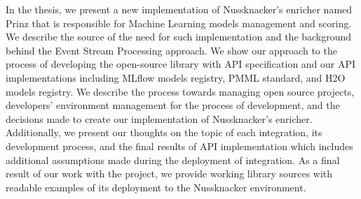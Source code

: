 In the thesis, we present a new implementation of Nussknacker's enricher named Prinz that is responsible for
Machine Learning models management and scoring. We describe the source of the need for such implementation and
the background behind the Event Stream Processing approach. We show our approach to the process of developing
the open-source library with API specification and our API implementations including MLflow models
registry, PMML standard, and H2O models registry. We describe the process towards managing open source projects,
developers' environment management for the process of development, and the decisions made to create our
implementation of Nussknacker’s enricher. Additionally, we present our thoughts on the topic of each integration,
its development process, and the final results of API implementation which includes additional assumptions made
during the deployment of integration. As a final result of our work with the project, we provide working
library sources with readable examples of its deployment to the Nussknacker environment.
